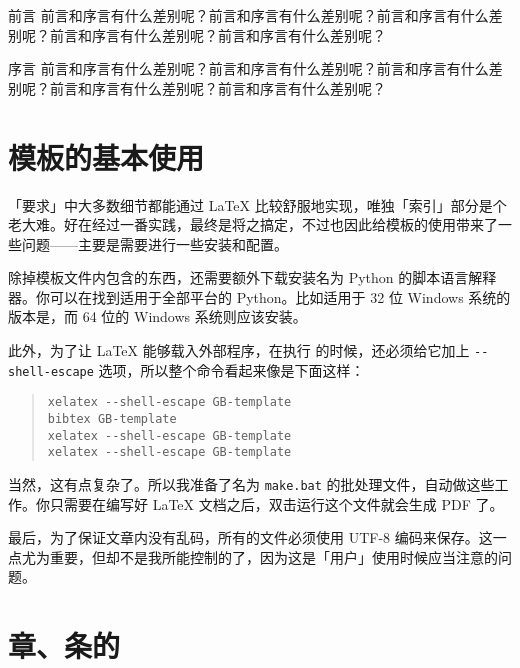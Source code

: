 \documentclass{GB-template}
\begin{document}

\frontmatter
\renewcommand{\thepage}{\Roman{page}}
\maketitlepage
\patchchapter
\tableofcontents\listoffigures\listoftables
\restorechapter
\begin{preamble}{前言}
    前言和序言有什么差别呢？前言和序言有什么差别呢？前言和序言有什么差别呢？前言和序言有什么差别呢？前言和序言有什么差别呢？
\end{preamble}
\begin{preamble}{序言}
    前言和序言有什么差别呢？前言和序言有什么差别呢？前言和序言有什么差别呢？前言和序言有什么差别呢？前言和序言有什么差别呢？
\end{preamble}
\mainmatter
\chapter{模板的基本使用}
「要求」中大多数细节都能通过 \LaTeX{} 比较舒服地实现，唯独「索引」部分是个老大难。好在经过一番实践，最终是将之搞定，不过也因此给模板的使用带来了一些问题——主要是需要进行一些安装和配置。

除掉模板文件内包含的东西，还需要额外下载安装名为 Python 的脚本语言解释器。你可以在\href{https://www.python.org/ftp/python/2.7.6/}{}找到适用于全部平台的 Python。比如适用于 32 位 Windows 系统的版本是\href{https://www.python.org/ftp/python/2.7.6/python-2.7.6.msi}{}，而 64 位的 Windows 系统则应该安装\href{https://www.python.org/ftp/python/2.7.6/python-2.7.6.amd64.msi}{}。

此外，为了让 \LaTeX{} 能够载入外部程序，在执行  的时候，还必须给它加上 \verb|--shell-escape| 选项，所以整个命令看起来像是下面这样：

\begin{quote}
\begin{verbatim}
xelatex --shell-escape GB-template
bibtex GB-template
xelatex --shell-escape GB-template
xelatex --shell-escape GB-template
\end{verbatim}
\end{quote}

当然，这有点复杂了。所以我准备了名为 \verb|make.bat| 的批处理文件，自动做这些工作。你只需要在编写好 \LaTeX{} 文档之后，双击运行这个文件就会生成 PDF 了。

最后，为了保证文章内没有乱码，所有的文件必须使用 UTF-8 编码来保存。这一点尤为重要，但却不是我所能控制的了，因为这是「用户」使用时候应当注意的问题。

\chapter{章、条的}
\end{document}
